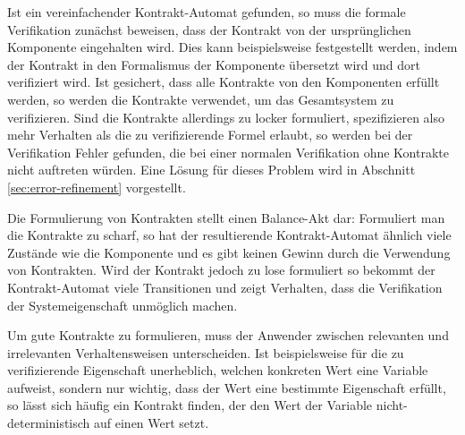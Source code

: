 Ist ein vereinfachender Kontrakt-Automat gefunden, so muss die formale Verifikation zunächst beweisen, dass der Kontrakt von der ursprünglichen Komponente eingehalten wird.
Dies kann beispielsweise festgestellt werden, indem der Kontrakt in den Formalismus der Komponente übersetzt wird und dort verifiziert wird.
Ist gesichert, dass alle Kontrakte von den Komponenten erfüllt werden, so werden die Kontrakte verwendet, um das Gesamtsystem zu verifizieren.
Sind die Kontrakte allerdings zu locker formuliert, spezifizieren also mehr Verhalten als die zu verifizierende Formel erlaubt, so werden bei der Verifikation Fehler gefunden, die bei einer normalen Verifikation ohne Kontrakte nicht auftreten würden.
Eine Lösung für dieses Problem wird in Abschnitt \ref{sec:error-refinement} vorgestellt.

Die Formulierung von Kontrakten stellt einen Balance-Akt dar:
Formuliert man die Kontrakte zu scharf, so hat der resultierende Kontrakt-Automat ähnlich viele Zustände wie die Komponente und es gibt keinen Gewinn durch die Verwendung von Kontrakten.
Wird der Kontrakt jedoch zu lose formuliert so bekommt der Kontrakt-Automat viele Transitionen und zeigt Verhalten, dass die Verifikation der Systemeigenschaft unmöglich machen.

Um gute Kontrakte zu formulieren, muss der Anwender zwischen relevanten und irrelevanten Verhaltensweisen unterscheiden.
Ist beispielsweise für die zu verifizierende Eigenschaft unerheblich, welchen konkreten Wert eine Variable aufweist, sondern nur wichtig, dass der Wert eine bestimmte Eigenschaft erfüllt, so lässt sich häufig ein Kontrakt finden, der den Wert der Variable nicht-deterministisch auf einen Wert setzt.